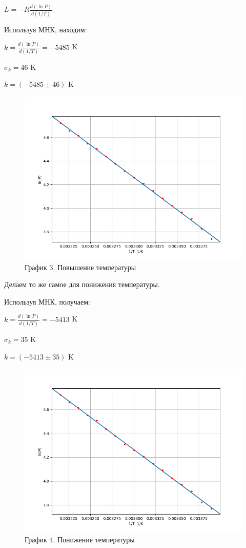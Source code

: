 \documentclass[a4paper,12pt]{article} %
\begin{document}
\begin{enumerate}
	$L = -R\frac{d(\ln{P})}{d(1/T)}$
	
	Используя МНК, находим:
	
	$k = \frac{d(\ln{P})}{d(1/T)} = -5485$ K
	
	$\sigma_{k} = 46$ K
	
	$k = (-5485 \pm 46)$ K
	\newpage
	\begin{figure}[h!]
		\centering
		\includegraphics[scale = 0.8]{График 3.png}
		\caption*{График 3. Повышение температуры}
	\end{figure}
	
	\vspace{15mm}
	
	Делаем то же самое для понижения температуры.
	
	Используя МНК, получаем:
	
	$k = \frac{d(\ln{P})}{d(1/T)} = -5413$ K
	
	$\sigma_{k} = 35$ K
	
	$k = (-5413 \pm 35)$ K
	\newpage
	\begin{figure}[h!]
		\centering
		\includegraphics[scale = 0.8]{График 4.png}
		\caption*{График 4. Понижение температуры}
	\end{figure}


\end{enumerate}
\end{document}
